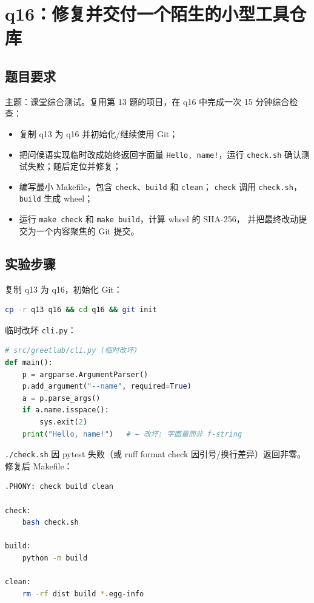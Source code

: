 \documentclass[a4paper,11pt]{ctexart}
\begin{document}
\section{q16：修复并交付一个陌生的小型工具仓库}

\subsection{题目要求}

主题：课堂综合测试。复用第 13 题的项目，在 q16 中完成一次 15 分钟综合检查：
\begin{itemize}
  \item 复制 q13 为 q16 并初始化/继续使用 Git；
  \item 把问候语实现临时改成始终返回字面量 \texttt{Hello, name!}，运行
        \texttt{check.sh} 确认测试失败；随后定位并修复；
  \item 编写最小 Makefile，包含 \texttt{check}、\texttt{build} 和 \texttt{clean}；
        \texttt{check} 调用 \texttt{check.sh}，\texttt{build} 生成 wheel；
  \item 运行 \texttt{make check} 和 \texttt{make build}，计算 wheel 的 SHA-256，
        并把最终改动提交为一个内容聚焦的 Git 提交。
\end{itemize}

\subsection{实验步骤}

复制 q13 为 q16，初始化 Git：

\begin{lstlisting}[language=bash]
cp -r q13 q16 && cd q16 && git init
\end{lstlisting}

临时改坏 \texttt{cli.py}：

\begin{lstlisting}[language=Python]
# src/greetlab/cli.py (临时改坏)
def main():
    p = argparse.ArgumentParser()
    p.add_argument("--name", required=True)
    a = p.parse_args()
    if a.name.isspace():
        sys.exit(2)
    print("Hello, name!")   # ← 改坏: 字面量而非 f-string
\end{lstlisting}

\texttt{./check.sh} 因 pytest 失败（或 ruff format check 因引号/换行差异）返回非零。修复后 Makefile：

\begin{lstlisting}[language=bash]
.PHONY: check build clean

check:
	bash check.sh

build:
	python -m build

clean:
	rm -rf dist build *.egg-info
\end{lstlisting}
\end{document}
